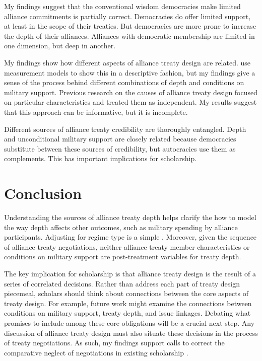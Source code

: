 \documentclass[12pt]{article}
\begin{document}
 
My findings suggest that the conventional wisdom democracies make limited alliance commitments is partially correct.
Democracies do offer limited support, at least in the scope of their treaties. 
But democracies are more prone to increase the depth of their alliances. 
Alliances with democratic membership are limited in one dimension, but deep in another. 


My findings show how different aspects of alliance treaty design are related. 
\citet{BensonClinton2016} use measurement models to show this in a descriptive fashion, but my findings give a sense of the process behind different combinations of depth and conditions on military support. 
Previous research on the causes of alliance treaty design \citep{Benson2012, Mattes2012, Chibaetal2015} focused on particular characteristics and treated them as independent. 
My results suggest that this approach can be informative, but it is incomplete. 


Different sources of alliance treaty credibility are thoroughly entangled. 
Depth and unconditional military support are closely related because democracies substitute between these sources of credibility, but autocracies use them as complements. 
This has important implications for scholarship. 


\section{Conclusion}


Understanding the sources of alliance treaty depth helps clarify the how to model the way depth affects other outcomes, such as military spending by alliance participants. 
Adjusting for regime type is a simple . 
Moreover, given the sequence of alliance treaty negotiations, neither alliance treaty member characteristics or conditions on military support are post-treatment variables for treaty depth. 


The key implication for scholarship is that alliance treaty design is the result of a series of correlated decisions. 
Rather than address each part of treaty design piecemeal, scholars should think about connections between the core aspects of treaty design. 
For example, future work might examine the connections between conditions on military support, treaty depth, and issue linkages.  
Debating what promises to include among these core obligations will be a crucial next step. 
Any discussion of alliance treaty design must also situate these decisions in the process of treaty negotiations.
As such, my findings support calls to correct the comparative neglect of negotiations in existing scholarship \citep{Poast2019a}. 
\end{document}
